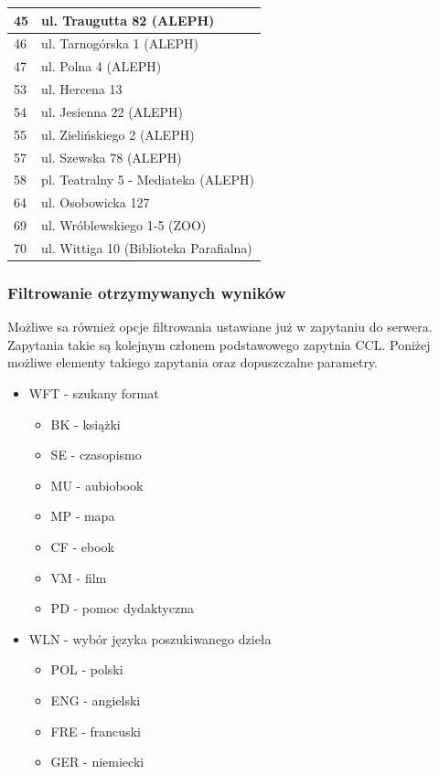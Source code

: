 \documentclass{report}
\begin{document}
\begin{longtable}{|p{2cm}|p{6cm}|}
					45 & ul. Traugutta 82 (ALEPH) \\ \hline
					46 & ul. Tarnogórska 1 (ALEPH) \\ \hline
					47 & ul. Polna 4 (ALEPH) \\ \hline
					53 & ul. Hercena 13 \\ \hline
					54 & ul. Jesienna 22 (ALEPH) \\ \hline
					55 & ul. Zielińskiego 2 (ALEPH) \\ \hline
					57 & ul. Szewska 78 (ALEPH) \\ \hline
					58 & pl. Teatralny 5 - Mediateka (ALEPH) \\ \hline
					64 & ul. Osobowicka 127 \\ \hline
					69 & ul. Wróblewskiego 1-5 (ZOO)\\ \hline
					70 & ul. Wittiga 10 (Biblioteka Parafialna)\\ \hline
				\end{longtable}
			
			\subsubsection{Filtrowanie otrzymywanych wyników}
				
				Możliwe sa również opcje filtrowania ustawiane już w zapytaniu do serwera. Zapytania takie są kolejnym członem podstawowego zapytnia CCL. Poniżej możliwe elementy takiego zapytania oraz dopuszczalne parametry. 
				
				\begin{itemize}
					\item WFT - szukany format 
					\begin{itemize}
						\item BK - książki 
						\item SE - czasopismo 
						\item MU - aubiobook 
						\item MP - mapa 
						\item CF - ebook
						\item VM - film 
						\item PD - pomoc dydaktyczna 
					\end{itemize}
					\item WLN - wybór języka poszukiwanego dzieła
					\begin{itemize}
						\item POL - polski
						\item ENG - angielski
						\item FRE - francuski
						\item GER - niemiecki
					\end{itemize}
				\end{itemize}
			
\end{document}
